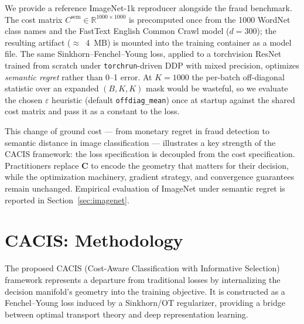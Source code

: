 \documentclass[sigconf,anonymous]{acmart}
\newcommand{\CACIS}{\textsc{CACIS}}
\newcommand{\mC}{\mathbf{C}}
\newcommand{\R}{\mathbb{R}}
\begin{document}
We provide a reference ImageNet-1k reproducer alongside the fraud benchmark. The cost matrix $C^{\mathrm{sem}} \in \R^{1000 \times 1000}$ is precomputed once from the 1000 WordNet class names and the FastText English Common Crawl model ($d=300$); the resulting artifact ($\approx$~4~MB) is mounted into the training container as a model file. The same Sinkhorn--Fenchel--Young loss, applied to a torchvision ResNet trained from scratch under \texttt{torchrun}-driven DDP with mixed precision, optimizes \emph{semantic regret} rather than 0--1 error. At $K=1000$ the per-batch off-diagonal statistic over an expanded $(B, K, K)$ mask would be wasteful, so we evaluate the chosen $\varepsilon$ heuristic (default \texttt{offdiag\_mean}) once at startup against the shared cost matrix and pass it as a constant to the loss.

This change of ground cost --- from monetary regret in fraud detection to semantic distance in image classification --- illustrates a key strength of the \CACIS{} framework: the loss specification is decoupled from the cost specification. Practitioners replace $\mC$ to encode the geometry that matters for their decision, while the optimization machinery, gradient strategy, and convergence guarantees remain unchanged. Empirical evaluation of ImageNet under semantic regret is reported in Section~\ref{sec:imagenet}.

\section{\CACIS{}: Methodology}
\label{sec:cacis}

The proposed \CACIS{} (Cost-Aware Classification with Informative Selection) framework represents a departure from traditional losses by internalizing the decision manifold's geometry into the training objective. It is constructed as a Fenchel--Young loss induced by a Sinkhorn/OT regularizer, providing a bridge between optimal transport theory and deep representation learning.
\end{document}
